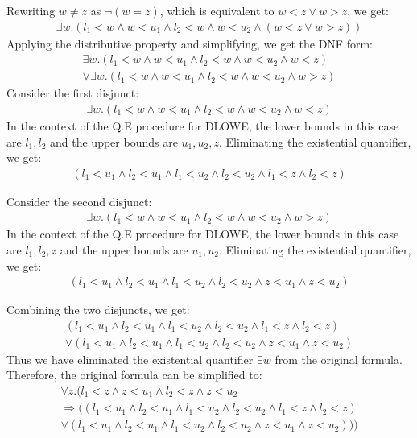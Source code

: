 \documentclass[12pt,letterpaper, onecolumn]{exam}
\begin{document}
\begin{questions}
	Rewriting $ w \neq z $ as $ \neg (w = z) $, which is equivalent to $ w < z \lor w > z $, we get:
	\begin{align*}
		\exists w. ( l_1 < w \land w < u_1 \land l_2 < w \land w < u_2 \land (w < z \lor w > z) )
	\end{align*}
	Applying the distributive property and simplifying, we get the DNF form:
	\begin{align*}
		\exists w. ( l_1 < w \land w < u_1 \land l_2 < w \land w < u_2 \land w < z ) \\
		\lor \exists w. ( l_1 < w \land w < u_1 \land l_2 < w \land w < u_2 \land w > z )
	\end{align*}
	Consider the first disjunct: 
	\begin{align*}
		\exists w. ( l_1 < w \land w < u_1 \land l_2 < w \land w < u_2 \land w < z )
	\end{align*}
	In the context of the Q.E procedure for DLOWE, the lower bounds in this case are $ l_1, l_2 $ and the upper bounds are $ u_1, u_2, z $.
	Eliminating the existential quantifier, we get:
	\begin{align*}
		(l_1 < u_1 \land l_2 < u_1 \land l_1 < u_2 \land l_2 < u_2 \land l_1 < z \land l_2 < z)
	\end{align*}

	Consider the second disjunct:
	\begin{align*}
		\exists w. ( l_1 < w \land w < u_1 \land l_2 < w \land w < u_2 \land w > z )
	\end{align*}
	In the context of the Q.E procedure for DLOWE, the lower bounds in this case are $ l_1, l_2, z $ and the upper bounds are $ u_1, u_2 $.
	Eliminating the existential quantifier, we get:
	\begin{align*}
		(l_1 < u_1 \land l_2 < u_1 \land l_1 < u_2 \land l_2 < u_2 \land z < u_1 \land z < u_2)
	\end{align*}

	Combining the two disjuncts, we get:
	\begin{align*}
		(l_1 < u_1 \land l_2 < u_1 \land l_1 < u_2 \land l_2 < u_2 \land l_1 < z \land l_2 < z) \\
		\lor (l_1 < u_1 \land l_2 < u_1 \land l_1 < u_2 \land l_2 < u_2 \land z < u_1 \land z < u_2)
	\end{align*}
	Thus we have eliminated the existential quantifier $ \exists w $ from the original formula. \\

	Therefore, the original formula can be simplified to:
	\begin{align*}
		\forall z. ( l_1 < z \land z < u_1 \land l_2 < z \land z < u_2 \\
		\Rightarrow ((l_1 < u_1 \land l_2 < u_1 \land l_1 < u_2 \land l_2 < u_2 \land l_1 < z \land l_2 < z) \\
		\lor (l_1 < u_1 \land l_2 < u_1 \land l_1 < u_2 \land l_2 < u_2 \land z < u_1 \land z < u_2)) )
	\end{align*}


\end{questions}
\end{document}
